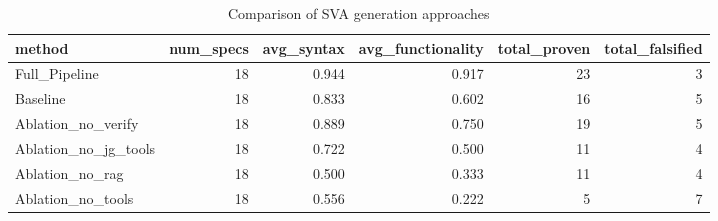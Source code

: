 \begin{table}[htbp]
\centering
\caption{Comparison of SVA generation approaches}
\begin{tabular}{lrrrrr}
\toprule
method & num\_specs & avg\_syntax & avg\_functionality & total\_proven & total\_falsified \\
\midrule
Full\_Pipeline & 18 & 0.944 & 0.917 & 23 & 3 \\
Baseline & 18 & 0.833 & 0.602 & 16 & 5 \\
Ablation\_no\_verify & 18 & 0.889 & 0.750 & 19 & 5 \\
Ablation\_no\_jg\_tools & 18 & 0.722 & 0.500 & 11 & 4 \\
Ablation\_no\_rag & 18 & 0.500 & 0.333 & 11 & 4 \\
Ablation\_no\_tools & 18 & 0.556 & 0.222 & 5 & 7 \\
\bottomrule
\end{tabular}
\end{table}